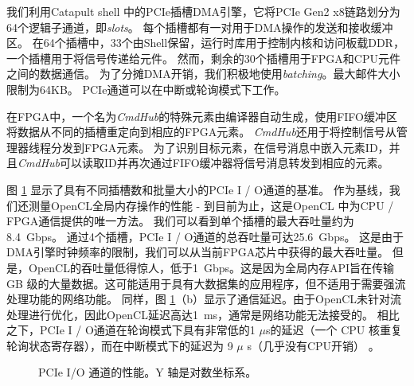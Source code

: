我们利用Catapult shell \cite {putnam2014reconfigurable}中的PCIe插槽DMA引擎，它将PCIe Gen2 x8链路划分为64个逻辑子通道，即\textit {slots}。
每个插槽都有一对用于DMA操作的发送和接收缓冲区。
在64个插槽中，33个由Shell保留，运行时库用于控制内核和访问板载DDR，一个插槽用于将信号传递给\name 元件。
然而，剩余的30个插槽用于FPGA和CPU元件之间的数据通信。
为了分摊DMA开销，我们积极地使用\textit {batching}。最大邮件大小限制为64KB。
PCIe通道可以在中断或轮询模式下工作。


在FPGA中，一个名为\textit {CmdHub}的特殊元素由\name 编译器自动生成，使用FIFO缓冲区将数据从不同的插槽重定向到相应的FPGA元素。
\textit {CmdHub}还用于将控制信号从管理器线程分发到FPGA元素。
为了识别目标元素，在信号消息中嵌入元素ID，并且\textit {CmdHub}可以读取ID并再次通过FIFO缓冲器将信号消息转发到相应的元素。

图 \ref {clicknp:fig:pcie} 显示了具有不同插槽数和批量大小的PCIe I / O通道的基准。
作为基线，我们还测量OpenCL全局内存操作的性能 - 到目前为止，这是OpenCL \cite {opencl}中为CPU / FPGA通信提供的唯一方法。
我们可以看到单个插槽的最大吞吐量约为8.4~Gbps。
通过4个插槽，PCIe I / O通道的总吞吐量可达25.6~Gbps。
这是由于DMA引擎时钟频率的限制，我们可以从当前FPGA芯片中获得的最大吞吐量。
但是，OpenCL的吞吐量低得惊人，低于1~Gbps。这是因为全局内存API旨在传输 GB 级的大量数据。这可能适用于具有大数据集的应用程序，但不适用于需要强流处理功能的网络功能。
同样，图 \ref {clicknp:fig:pcie}（b）显示了通信延迟。由于OpenCL未针对流处理进行优化，因此OpenCL延迟高达1~ms，通常是网络功能无法接受的。
相比之下，PCIe I / O通道在轮询模式下具有非常低的1 $\mu$s的延迟（一个 CPU 核重复轮询状态寄存器），而在中断模式下的延迟为 9 $\mu$ s（几乎没有CPU开销） 。

\begin{figure}[t!]
	\centering

	\caption{PCIe I/O 通道的性能。Y 轴是对数坐标系。}

	\label{clicknp:fig:pcie}
\end{figure}

